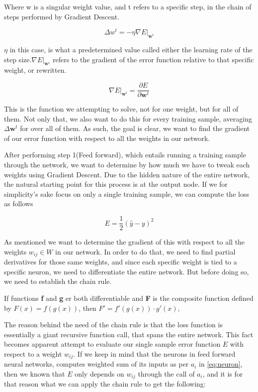 Where w is a singular weight value, and t refers to a specific step, in the 
chain of steps performed by Gradient Descent.

\begin{equation}
\Delta w^t = -\eta \nabla E|_{\pmb{w}^t}
\end{equation}

$\eta$ in this case, is what a predetermined value called either the learning
rate of the step size.$\nabla E|_{\pmb{w}^t}$ refers to the gradient of the
error function relative to that specific weight, or rewritten.

$$
\nabla E|_{\pmb{w}^t} = \frac{\partial E}{\partial \pmb{w}^t}
$$

This is the function we attempting to solve, not for one weight, but for all
of them. Not only that, we also want to do this for every training sample,
averaging $\Delta \pmb{w}^t$ for over all of them. As such, the goal is clear,
we want to find the gradient of our error function with respect to all the
weights in our network.

After performing step 1(Feed forward), which entails running a training sample
through the network, we want to determine by how much we have to tweak each
weights using Gradient Descent. Due to the hidden nature of the entire network,
the natural starting point for this process is at the output node. If we for
simplicity's sake focus on only a single training sample, we can compute the
loss as follows

$$
E = \frac{1}{2}(\hat{y} - y)^2
$$

As mentioned we want to determine the gradient of this with respect to all the
weights $w_{ij} \in W$ in our network. In order to do that, we need to find
partial derivatives for those same weights, and since each specific weight is
tied to a specific neuron, we need to differentiate the entire network. But
before doing so, we need to establish the chain rule.

\begin{lemma}
\label{lemma:chainrule}

    If functions \textbf{f} and \textbf{g} er both differentiable and
    \textbf{F} is the composite function defined by $F(x) = f(g(x))$,
    then $F' = f'(g(x)) \cdot g'(x)$,

\end{lemma}

The reason behind the need of the chain rule is that the loss function
is essentially a giant recursive function call, that spans the entire
network. This fact becomes apparent attempt to evaluate our single sample
error function $E$ with respect to a weight $w_{ij}$. If we keep in mind
that the neurons in feed forward neural networks, computes weighted
sum of its inputs as per $a_i$ in \eqref{eq:neuron}, then we known
that $E$ only depends on $w_{ij}$ through the call of $a_i$, and it is
for that reason what we can apply the chain rule to get the following:

